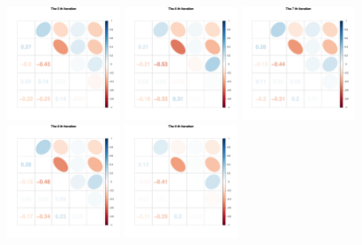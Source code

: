 \begin{figure}[h]
\includegraphics[width=0.3\textwidth,height=0.18\textheight]{Chapters/05MCMCOU/plots/paraEvolution/corMatrix5.pdf}
\includegraphics[width=0.3\textwidth,height=0.18\textheight]{Chapters/05MCMCOU/plots/paraEvolution/corMatrix6.pdf}
\includegraphics[width=0.3\textwidth,height=0.18\textheight]{Chapters/05MCMCOU/plots/paraEvolution/corMatrix7.pdf}
\includegraphics[width=0.3\textwidth,height=0.18\textheight]{Chapters/05MCMCOU/plots/paraEvolution/corMatrix8.pdf}
\includegraphics[width=0.3\textwidth,height=0.18\textheight]{Chapters/05MCMCOU/plots/paraEvolution/corMatrix9.pdf}

\end{figure}
